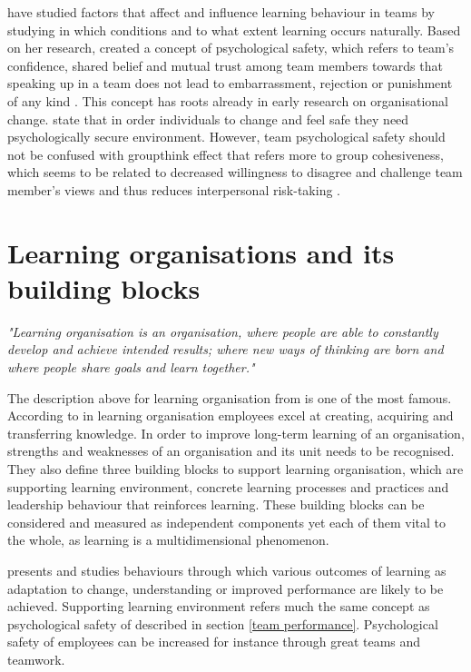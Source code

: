 \citet{edmondson1999psychological} have studied factors that affect and influence learning behaviour in teams by studying in which conditions and to what extent learning occurs naturally. Based on her research, \citet{edmondson1999psychological} created a concept of psychological safety, which refers to team's confidence, shared belief and mutual trust among team members towards that speaking up in a team does not lead to embarrassment, rejection or punishment of any kind \citep{edmondson1999psychological}. This concept has roots already in early research on organisational change. \citet{schein1965personal} state that in order individuals to change and feel safe they need psychologically secure environment. However, team psychological safety should not be confused with groupthink effect that refers more to group cohesiveness, which seems to be related to decreased willingness to disagree and challenge team member's views and thus reduces interpersonal risk-taking \citep{janis1982groupthink}.

\section{Learning organisations and its building blocks}
 \textit{"Learning organisation is an organisation, where people are able to constantly develop and achieve intended results; where new ways of thinking are born and where people share goals and learn together."} \citep{senge1990fifth}
\newline
\newline

The description above for learning organisation from \citet{senge1990fifth} is one of the most famous. According to \citet{garvin2008yours} in learning organisation employees excel at creating, acquiring and transferring knowledge. In order to improve long-term learning of an organisation, strengths and weaknesses of an organisation and its unit needs to be recognised. They also define three building blocks to support learning organisation, which are supporting learning environment, concrete learning processes and practices and leadership behaviour that reinforces learning. These building blocks can be considered and measured as independent components yet each of them vital to the whole, as learning is a multidimensional phenomenon. \citep{garvin2008yours} 

 \citet{edmondson1999psychological} presents and studies behaviours through which various outcomes of learning as adaptation to change, understanding or improved performance are likely to be achieved. Supporting learning environment refers much the same concept as psychological safety of  \citet{edmondson1999psychological} described in section \ref{team performance}. Psychological safety of employees can be increased for instance through great teams and teamwork\citep{edmondson1999psychological}.

